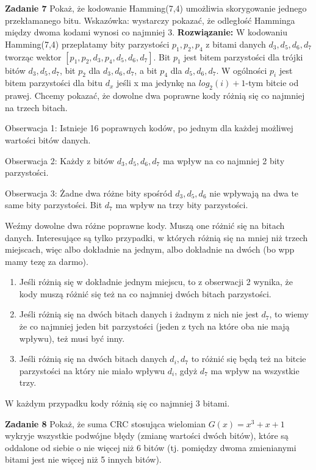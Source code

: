 \documentclass[12pt,a4paper]{article}
\begin{document}
\vskip10pt

\noindent
\textbf{Zadanie 7} Pokaż, że kodowanie Hamming(7,4) umożliwia skorygowanie jednego przekłamanego bitu. Wskazówka: wystarczy pokazać, że odległość Hamminga między dwoma kodami wynosi co najmniej 3.
\vskip5pt
\noindent
\textbf{Rozwiązanie:} W kodowaniu Hamming(7,4) przeplatamy bity parzystości \(p_1,p_2,p_4\) z bitami danych \(d_3, d_5, d_6, d_7\) tworząc wektor \([ p_1, p_2, d_3, p_4, d_5, d_6, d_7 ]\). Bit \(p_1\) jest bitem parzystości dla trójki bitów \(d_3, d_5, d_7\), bit \(p_2\) dla \(d_3, d_6, d_7\), a bit \(p_4\) dla \(d_5, d_6, d_7\). W ogólności \(p_i\) jest bitem parzystości dla bitu \(d_x\) jeśli x ma jedynkę na \(log_2(i)+1\)-tym bitcie od prawej. Chcemy pokazać, że dowolne dwa poprawne kody różnią się co najmniej na trzech bitach.

\vskip5pt

\noindent
Obserwacja 1: Istnieje 16 poprawnych kodów, po jednym dla każdej możliwej wartości bitów danych.

\noindent
Obserwacja 2: Każdy z bitów \(d_3, d_5, d_6, d_7\) ma wpływ na co najmniej 2 bity parzystości.

\noindent
Obserwacja 3: Żadne dwa różne bity spośród \(d_3,d_5,d_6\) nie wpływają na dwa te same bity parzystości. Bit \(d_7\) ma wpływ na trzy bity parzystości.

\vskip5pt

Weźmy dowolne dwa różne poprawne kody. Muszą one różnić się na bitach danych. Interesujące są tylko przypadki, w których różnią się na mniej niż trzech miejscach, więc albo dokładnie na jednym, albo dokładnie na dwóch (bo wpp mamy tezę za darmo).

\begin{enumerate}
	\item Jeśli różnią się w dokładnie jednym miejscu, to z obserwacji 2 wynika, że kody muszą różnić się też na co najmniej dwóch bitach parzystości.
	\item Jeśli różnią się na dwóch bitach danych i żadnym z nich nie jest \(d_7\), to wiemy że co najmniej jeden bit parzystości (jeden z tych na które oba nie mają wpływu), też musi być inny.
	\item Jeśli różnią się na dwóch bitach danych \(d_i, d_7\) to różnić się będą też na bitcie parzystości na który nie miało wpływu \(d_i\), gdyż \(d_7\) ma wpływ na wszystkie trzy.
\end{enumerate}
W każdym przypadku kody różnią się co najmniej 3 bitami.

\vskip10pt
\noindent
\textbf{Zadanie 8} Pokaż, że suma CRC stosująca wielomian \(G(x) = x^3 + x + 1\) wykryje wszystkie podwójne błędy (zmianę wartości dwóch bitów), które są oddalone od siebie o nie więcej niż 6 bitów (tj. pomiędzy dwoma zmienianymi bitami jest nie więcej niż 5 innych bitów).
\end{document}
